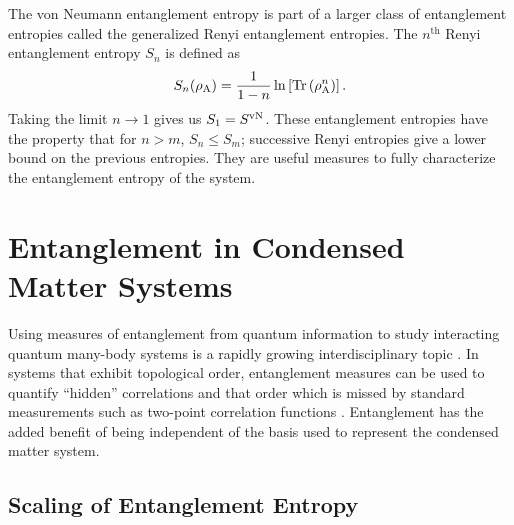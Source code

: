 The von Neumann entanglement entropy is part of a larger class of entanglement entropies called the generalized Renyi entanglement entropies.
The $n^\text{th}$ Renyi entanglement entropy $S_n$ is defined as
\begin{equation} \label{renyi}
 	S_n(\rho_{\rm A}) = \frac{1}{1-n}\ln\left[{\rm Tr}\left( \rho_{\rm A}^n \right) \right].
\end{equation}
Taking the limit $n\to1$ gives us $S_1 = S^{\text{vN}}$.  These entanglement entropies have the property that for $n>m$, $S_n\le S_m$; successive Renyi entropies give a lower bound on the previous entropies. They are useful measures to fully characterize the entanglement entropy of the system.



\section{Entanglement in Condensed Matter Systems}

Using measures of entanglement from quantum information to study interacting quantum many-body systems is a rapidly growing interdisciplinary topic \cite{Amico, intro}.
In systems that exhibit topological order, entanglement measures can be used to quantify ``hidden'' correlations \cite{wolf} and that order which is missed by standard measurements such as two-point correlation functions \cite{Bbob, KP, LW, Spectrum}.
Entanglement has the added benefit of being independent of the basis used to represent the condensed matter system.

\subsection{Scaling of Entanglement Entropy}
\label{1dcft}

